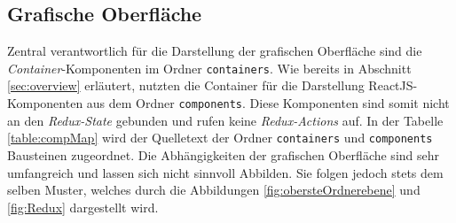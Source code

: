 \subsection{Grafische Oberfläche}

Zentral verantwortlich für die Darstellung der grafischen Oberfläche sind die \emph{Container}-Komponenten im Ordner \lstinline|containers|. Wie bereits in  Abschnitt \ref{sec:overview} erläutert, nutzten die Container für die Darstellung ReactJS-Komponenten aus dem Ordner \lstinline|components|.
Diese Komponenten sind somit nicht an den \emph{Redux-State} gebunden und rufen keine \emph{Redux-Actions} auf.
In der Tabelle \ref{table:compMap} wird der Quelletext der Ordner \lstinline|containers| und \lstinline|components| Bausteinen zugeordnet. Die Abhängigkeiten der grafischen Oberfläche sind sehr umfangreich und lassen sich nicht sinnvoll Abbilden. Sie folgen jedoch stets dem selben Muster, welches durch die Abbildungen \ref{fig:obersteOrdnerebene} und \ref{fig:Redux} dargestellt wird.

